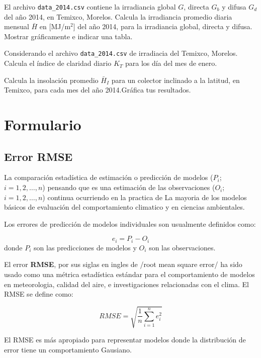 \documentclass[spanish, letterpaper,12]{article}
\newenvironment{problem}[2][Problema]{\begin{trivlist}
\item[\hskip \labelsep {\bfseries #1}\hskip \labelsep {\bfseries #2.}]}{\end{trivlist}}
\begin{document}
\begin{problem}{2}

  El archivo \verb|data_2014.csv| contiene la irradiancia global $G$, directa $G_{b}$ y difusa $G_{d}$ del año 2014, en Temixco, Morelos. Calcula la irradiancia promedio diaria mensual $\bar{H}$ en [MJ/m$^{2}$] del año 2014, para la irradiancia global, directa y difusa. Mostrar gráficamente e indicar una tabla.

\end{problem}

\begin{problem}{3}
  Considerando el archivo \verb|data_2014.csv| de irradiacia del Temixco, Morelos. Calcula el índice de claridad diario $K_{T}$ para los día del mes de enero.
\end{problem}

\begin{problem}{4}
  Calcula la insolación promedio $\bar{H}_{I}$ para un colector inclinado a la latitud, en Temixco, para cada mes del año 2014.Gráfica tus resultados.
\end{problem}


\section*{Formulario}
\label{sec:Formulario}

\subsection{Error RMSE}
\label{subsec:error}

La comparación estadística de estimación o predicción de modelos ($P_i$; $i=1,2,\ldots,n$) pensando que es una estimación de las observaciones ($O_i$;$i=1,2,\ldots,n$) continua ocurriendo en la practica de
La mayoria de los modelos básicos de evaluación del comportamiento climatico y en ciencias ambientales.

Los errores de predicción de modelos individuales son usualmente definidos como:

\begin{equation}
    \label{eq:error}
    e_i = P_i - O_i
  \end{equation}
  donde $P_{i}$ son las predicciones de modelos y $O_{i}$ son las observaciones.

  El error \textbf{RMSE}, por sus siglas en ingles de /root mean square error/ ha sido usado como una métrica estadística estándar para el comportamiento de modelos en meteorologia, calidad del aire, e investigaciones relacionadas con el clima. El RMSE se define como:

  \begin{equation}
    \label{eq:rmse}
    RMSE = \sqrt{ \dfrac{1}{n} \sum_{i=1}^n e_i^2 }
  \end{equation}

  El RMSE es más apropiado para representar modelos donde la distribución de error tiene un comportamiento Gausiano.
\end{document}
